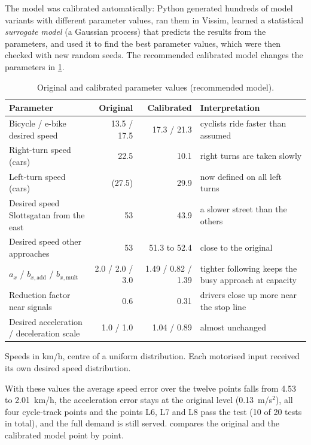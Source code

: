 \documentclass[11pt,a4paper]{article}
\newcommand{\kmh}{~km/h}
\begin{document}
The model was calibrated automatically: Python generated hundreds of model variants with different
parameter values, ran them in Vissim, learned a statistical \emph{surrogate model} (a Gaussian
process) that predicts the results from the parameters, and used it to find the best parameter
values, which were then checked with new random seeds. The recommended calibrated model changes the
parameters in \cref{tab:calib}.

\begin{table}[!htb]
\centering
\caption[Original and calibrated parameters]{Original and calibrated parameter values
(recommended model).}
\label{tab:calib}
\small
\begin{tabularx}{\textwidth}{lrrX}
\toprule
\textbf{Parameter} & \textbf{Original} & \textbf{Calibrated} & \textbf{Interpretation}\\
\midrule
Bicycle / e-bike desired speed & 13.5 / 17.5 & 17.3 / 21.3 & cyclists ride faster than assumed\\
Right-turn speed (cars) & 22.5 & 10.1 & right turns are taken slowly\\
Left-turn speed (cars) & (27.5) & 29.9 & now defined on all left turns\\
Desired speed Slottsgatan from the east & 53 & 43.9 & a slower street than the others\\
Desired speed other approaches & 53 & 51.3 to 52.4 & close to the original\\
$a_x$ / $b_{x,\mathrm{add}}$ / $b_{x,\mathrm{mult}}$ & 2.0 / 2.0 / 3.0 & 1.49 / 0.82 / 1.39 & tighter following keeps the busy approach at capacity\\
Reduction factor near signals & 0.6 & 0.31 & drivers close up more near the stop line\\
Desired acceleration / deceleration scale & 1.0 / 1.0 & 1.04 / 0.89 & almost unchanged\\
\bottomrule
\end{tabularx}
\smallskip

{\footnotesize Speeds in km/h, centre of a uniform distribution. Each motorised input received its
own desired speed distribution.}
\end{table}

With these values the average speed error over the twelve points falls from 4.53 to 2.01\kmh, the
acceleration error stays at the original level (0.13~m/s$^2$), all four cycle-track points and the
points L6, L7 and L8 pass the test (10 of 20 tests in total), and the full demand is still served.
 compares the original and the calibrated model point by point.
\end{document}
